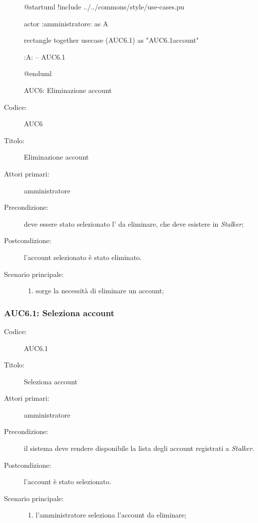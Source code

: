 \documentclass[../../../analisi-dei-requisiti.tex]{subfiles}
\begin{document}
\begin{figure}[H]
  \centering
  \begin{plantuml}
  @startuml
  !include ../../commons/style/use-cases.pu

  actor :amministratore: as A

  rectangle {
    together {
      usecase (AUC6.1) as "AUC6.1\nSeleziona account"
    }
  }

  :A: -- AUC6.1

  @enduml
  \end{plantuml}
  \caption{AUC6: Eliminazione account}
  \label{fig:auc6}
\end{figure}

\begin{description}
  \item[Codice:] AUC6
  \item[Titolo:] Eliminazione account
  \item[Attori primari:] amministratore
  \item[Precondizione:] deve essere stato selezionato l' da eliminare, che deve esistere in \emph{Stalker};
  \item[Postcondizione:] l'account selezionato è stato eliminato.
  \item[Scenario principale:]
  \begin{enumerate}
    \item sorge la necessità di eliminare un account;
  \end{enumerate}
\end{description}

\subsubsection{AUC6.1: Seleziona account}%
\label{subs:AUC6.1}
\begin{description}
  \item[Codice:] AUC6.1
  \item[Titolo:] Seleziona account
  \item[Attori primari:] amministratore
  \item[Precondizione:] il sistema deve rendere disponibile la lista degli account registrati a \emph{Stalker}.
  \item[Postcondizione:] l'account è stato selezionato.
  \item[Scenario principale:]
  \begin{enumerate}
    \item l'amministratore seleziona l'account da eliminare;
  \end{enumerate}
\end{description}
\end{document}
